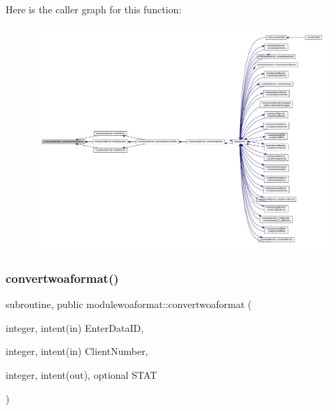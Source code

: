Here is the caller graph for this function\+:\nopagebreak
\begin{figure}[H]
\begin{center}
\leavevmode
\includegraphics[width=350pt]{namespacemodulewoaformat_aefda2556422f044d5397391c5c5acb66_icgraph}
\end{center}
\end{figure}
\mbox{\label{namespacemodulewoaformat_a78a5f7c9fae1c493a47fc480b6f3dd86}} 
\subsubsection{\texorpdfstring{convertwoaformat()}{convertwoaformat()}}
{\footnotesize\ttfamily subroutine, public modulewoaformat\+::convertwoaformat (\begin{DoxyParamCaption}\item[{integer, intent(in)}]{Enter\+Data\+ID,  }\item[{integer, intent(in)}]{Client\+Number,  }\item[{integer, intent(out), optional}]{S\+T\+AT }\end{DoxyParamCaption})}

